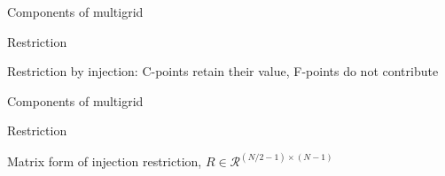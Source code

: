 \documentclass[18pt,xcolor=table]{beamer}
\begin{document}
\begin{frame}{Components of multigrid}
\begin{block}{Restriction}
\bit
\item Restriction by injection: C-points retain their value, F-points do not contribute
\eit
\end{block}
\end{frame}

\begin{frame}{Components of multigrid}
\begin{block}{Restriction}
\bit
\item Matrix form of injection restriction, $R\in\mathcal{R}^{(N/2-1)\times(N-1)}$
\eit
{}
\end{block}
\end{frame}
\end{document}
